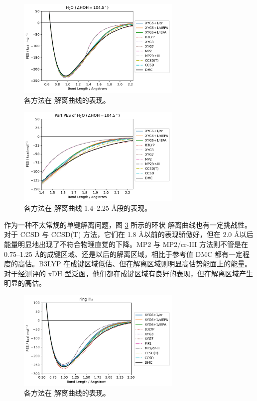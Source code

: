 \begin{figure}[h]
  \centering
  \includegraphics[width=0.7\textwidth]{assets/curve-H2O.pdf}
  \caption{各方法在  解离曲线的表现。}
  \label{fig.2.curve-H2O}
\end{figure}

\begin{figure}[h]
  \centering
  \includegraphics[width=0.7\textwidth]{assets/curve-H2O-part.pdf}
  \caption{各方法在  解离曲线 1.4--2.25 \AA 段的表现。}
  \label{fig.2.curve-H2O-part}
\end{figure}

作为一种不太常规的单键解离问题，图 \ref{fig.2.curve-H6} 所示的环状  解离曲线也有一定挑战性。对于 CCSD 与 CCSD(T) 方法，它们在 1.8 \AA 以前的表现骄傲好，但在 2.0 \AA 以后能量明显地出现了不符合物理直觉的下降。MP2 与 MP2/cr-III 方法则不管是在 0.75--1.25 \AA 的成键区域、还是以后的解离区域，相比于参考值 DMC 都有一定程度的高估。B3LYP 在成键区域低估、但在解离区域则明显高估势能面上的能量。对于经测评的 xDH 型泛函，他们都在成键区域有良好的表现，但在解离区域产生明显的高估。

\begin{figure}[h]
  \centering
  \includegraphics[width=0.7\textwidth]{assets/curve-H6.pdf}
  \caption{各方法在  解离曲线的表现。}
  \label{fig.2.curve-H6}
\end{figure}

